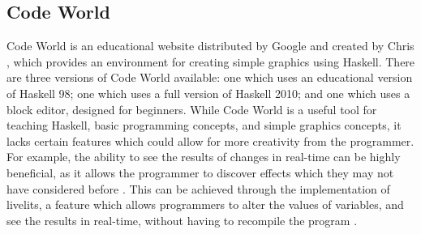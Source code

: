 \documentclass[../main.tex]{subfiles}
\begin{document}
        \subsection{Code World}
            Code World is an educational website distributed by Google and created by Chris
                \citet{codeWorldGitHub}, which provides an environment for creating simple
                graphics using Haskell.
            There are three versions of Code World available: one which uses an educational
                version of Haskell 98; one which uses a full version of Haskell 2010; and one
                which uses a block editor, designed for beginners.
            While Code World is a useful tool for teaching Haskell, basic programming
                concepts, and simple graphics concepts, it lacks certain features which could
                allow for more creativity from the programmer.
            For example, the ability to see the results of changes in real-time can be
                highly beneficial, as it allows the programmer to discover effects which they
                may not have considered before \citep{inventingOnPrinciple}.
            This can be achieved through the implementation of livelits, a feature which
                allows programmers to alter the values of variables, and see the results in
                real-time, without having to recompile the program \citep{livelits}.
\end{document}
